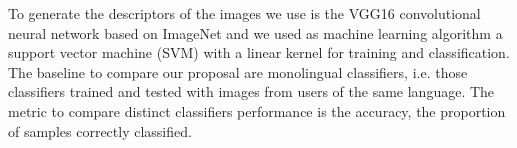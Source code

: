 \documentclass[runningheads]{llncs}
\begin{document}
To generate the descriptors of the images we use is the VGG16 convolutional
neural network based on ImageNet and we used as machine learning algorithm a support vector 
machine (SVM) with a linear kernel for training and classification. The 
baseline to compare our proposal are monolingual classifiers, i.e. 
those classifiers trained and tested with images from users of the same language.
The metric to compare distinct classifiers performance is the accuracy, the proportion of samples correctly classified.




\end{document}
